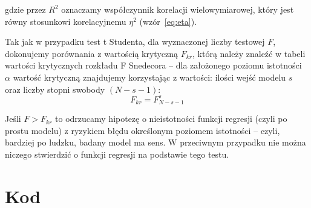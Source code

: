\documentclass[11pt, a4paper]{article}
\begin{document}
gdzie przez $R^2$ oznaczamy współczynnik korelacji wielowymiarowej, który jest równy stosunkowi korelacyjnemu $\eta^2$ (wzór~\ref{eq:eta}).

Tak jak w przypadku test t Studenta, dla wyznaczonej liczby testowej $F$, dokonujemy porównania z wartością krytyczną $F_{kr}$, którą należy znaleźć w tabeli wartości krytycznych rozkładu F Snedecora -- dla założonego poziomu istotności $\alpha$ wartość krytyczną znajdujemy korzystając z wartości: ilości wejść modelu $s$ oraz liczby stopni swobody $(N - s - 1)$:
\begin{equation}
	F_{kr} = F^s_{N - s - 1}
\end{equation}

Jeśli $F > F_{kr}$ to odrzucamy hipotezę o nieistotności funkcji regresji (czyli po prostu modelu) z ryzykiem błędu określonym poziomem istotności -- czyli, bardziej po ludzku, badany model ma sens. W przeciwnym przypadku nie można niczego stwierdzić o funkcji regresji na podstawie tego testu.

\section{Kod}
\end{document}
